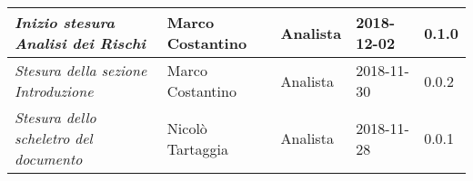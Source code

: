 \begin{table}[H]
\begin{tabular}{p{4cm}|C{3cm}|C{3cm}|R{2.5cm}|R{2cm}}
		\emph{\textit{Inizio stesura Analisi dei Rischi}} & Marco Costantino & Analista & 2018-12-02 & 0.1.0 \\
		\hline
		
		\emph{Stesura della sezione Introduzione} & Marco Costantino & Analista & 2018-11-30 & 0.0.2 \\
		\hline
		
		\emph{Stesura dello scheletro del documento} & Nicolò Tartaggia & Analista & 2018-11-28 & 0.0.1 \\
		
	\end{tabular}
	
\end{table}


\clearpage